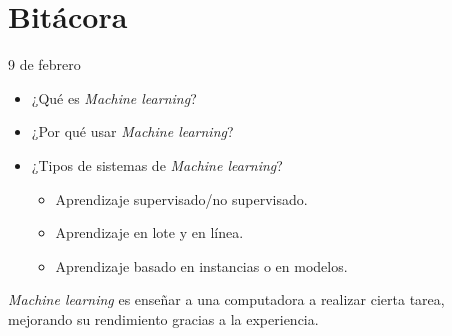 
\maketitle

\part{Bitácora}
\begin{entry}{9 de febrero}
\tcbsubtitle{\LBlimportant}
\begin{itemize}
    \item ¿Qué es \textit{Machine learning}?
    \item ¿Por qué usar \textit{Machine learning}?
    \item ¿Tipos de sistemas de \textit{Machine learning}?
    \begin{itemize}
        \item Aprendizaje supervisado/no supervisado.
        \item Aprendizaje en lote y en línea.
        \item Aprendizaje basado en instancias o en modelos.
    \end{itemize}
\end{itemize}
\tcblower
\tcbsubtitle{\LBlsummary}
\textit{Machine learning} es enseñar a una computadora a realizar cierta tarea, mejorando su rendimiento gracias a la experiencia.\\


\end{entry}
